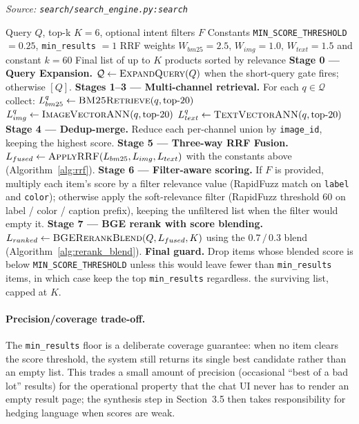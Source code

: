 \begin{algorithm}[H]
\caption{HybridSearch --- Seven-Stage Pipeline (PATH 1)}\label{alg:hybrid_search}
\textit{Source: \texttt{search/search\_engine.py:search}}
\begin{algorithmic}[1]
\Require Query $Q$, top-k $K{=}6$, optional intent filters $F$
\Require Constants \texttt{MIN\_SCORE\_THRESHOLD} $= 0.25$, \texttt{min\_results} $= 1$
\Require RRF weights $W_{bm25}{=}2.5,\, W_{img}{=}1.0,\, W_{text}{=}1.5$ and constant $k{=}60$
\Ensure Final list of up to $K$ products sorted by relevance
\State \textbf{Stage 0 --- Query Expansion.} $\mathcal{Q} \gets \textsc{ExpandQuery}(Q)$ when the short-query gate fires; otherwise $[Q]$.
\State \textbf{Stages 1--3 --- Multi-channel retrieval.} For each $q \in \mathcal{Q}$ collect:
\Statex \quad\quad $L_{bm25}^{q} \gets \textsc{BM25Retrieve}(q, \text{top-20})$
\Statex \quad\quad $L_{img}^{q} \gets \textsc{ImageVectorANN}(q, \text{top-20})$
\Statex \quad\quad $L_{text}^{q} \gets \textsc{TextVectorANN}(q, \text{top-20})$
\State \textbf{Stage 4 --- Dedup-merge.} Reduce each per-channel union by \texttt{image\_id}, keeping the highest score.
\State \textbf{Stage 5 --- Three-way RRF Fusion.} $L_{fused} \gets \textsc{ApplyRRF}(L_{bm25}, L_{img}, L_{text})$ with the constants above (Algorithm~\ref{alg:rrf}).
\State \textbf{Stage 6 --- Filter-aware scoring.} If $F$ is provided, multiply each item's score by a filter relevance value (RapidFuzz match on \texttt{label} and \texttt{color}); otherwise apply the soft-relevance filter (RapidFuzz threshold $60$ on label / color / caption prefix), keeping the unfiltered list when the filter would empty it.
\State \textbf{Stage 7 --- BGE rerank with score blending.} $L_{ranked} \gets \textsc{BGERerankBlend}(Q, L_{fused}, K)$ using the $0.7\,/\,0.3$ blend (Algorithm~\ref{alg:rerank_blend}).
\State \textbf{Final guard.} Drop items whose blended score is below \texttt{MIN\_SCORE\_THRESHOLD} unless this would leave fewer than \texttt{min\_results} items, in which case keep the top \texttt{min\_results} regardless.
\State \Return the surviving list, capped at $K$.
\end{algorithmic}
\end{algorithm}

\paragraph{Precision/coverage trade-off.}
The \texttt{min\_results} floor is a deliberate coverage guarantee: when no item clears the score threshold, the system still returns its single best candidate rather than an empty list. This trades a small amount of precision (occasional ``best of a bad lot'' results) for the operational property that the chat UI never has to render an empty result page; the synthesis step in Section~3.5 then takes responsibility for hedging language when scores are weak.

